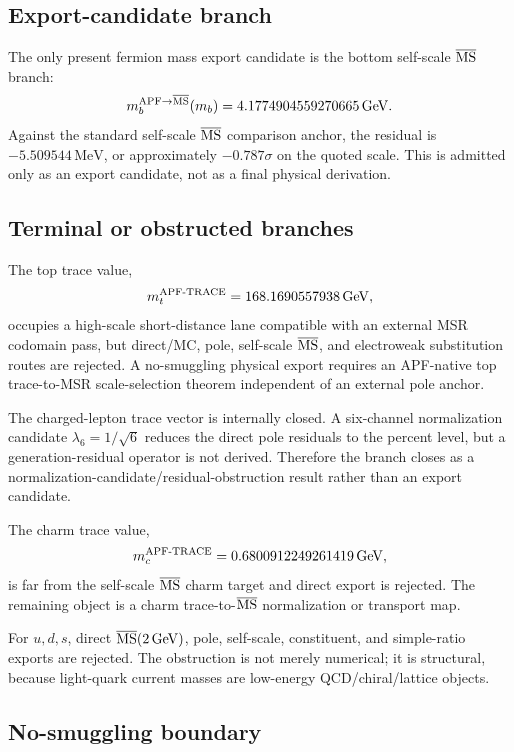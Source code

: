 \subsection{Export-candidate branch}

The only present fermion mass export candidate is the bottom self-scale \(\overline{\rm MS}\) branch:
\[
 m_b^{\rm APF\to\overline{MS}}(m_b)=4.1774904559270665\,\mathrm{GeV}.
\]
Against the standard self-scale \(\overline{\rm MS}\) comparison anchor, the residual is \(-5.509544\,\mathrm{MeV}\), or approximately \(-0.787\sigma\) on the quoted scale.  This is admitted only as an export candidate, not as a final physical derivation.

\subsection{Terminal or obstructed branches}

The top trace value,
\[
 m_t^{\rm APF\text{-}TRACE}=168.1690557938\,\mathrm{GeV},
\]
occupies a high-scale short-distance lane compatible with an external MSR codomain pass, but direct/MC, pole, self-scale \(\overline{\rm MS}\), and electroweak substitution routes are rejected.  A no-smuggling physical export requires an APF-native top trace-to-MSR scale-selection theorem independent of an external pole anchor.

The charged-lepton trace vector is internally closed.  A six-channel normalization candidate \(\lambda_6=1/\sqrt{6}\) reduces the direct pole residuals to the percent level, but a generation-residual operator is not derived.  Therefore the branch closes as a normalization-candidate/residual-obstruction result rather than an export candidate.

The charm trace value,
\[
 m_c^{\rm APF\text{-}TRACE}=0.6800912249261419\,\mathrm{GeV},
\]
is far from the self-scale \(\overline{\rm MS}\) charm target and direct export is rejected.  The remaining object is a charm trace-to-\(\overline{\rm MS}\) normalization or transport map.

For \(u,d,s\), direct \(\overline{\rm MS}(2\,\mathrm{GeV})\), pole, self-scale, constituent, and simple-ratio exports are rejected.  The obstruction is not merely numerical; it is structural, because light-quark current masses are low-energy QCD/chiral/lattice objects.

\subsection{No-smuggling boundary}

